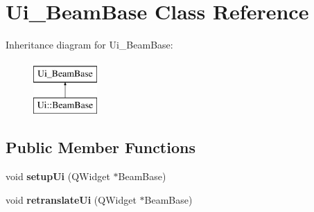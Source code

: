 \hypertarget{class_ui___beam_base}{}\section{Ui\+\_\+\+Beam\+Base Class Reference}
\label{class_ui___beam_base}
Inheritance diagram for Ui\+\_\+\+Beam\+Base\+:\begin{figure}[H]
\begin{center}
\leavevmode
\includegraphics[height=2.000000cm]{class_ui___beam_base}
\end{center}
\end{figure}
\subsection*{Public Member Functions}
\begin{DoxyCompactItemize}
\item 
\mbox{\label{class_ui___beam_base_aab56f660cad7cf0c8080bc2c76ff2ee8}} 
void {\bfseries setup\+Ui} (Q\+Widget $\ast$Beam\+Base)
\item 
\mbox{\label{class_ui___beam_base_a505cf6f979302170a61a24f22034fe6f}} 
void {\bfseries retranslate\+Ui} (Q\+Widget $\ast$Beam\+Base)
\end{DoxyCompactItemize}
